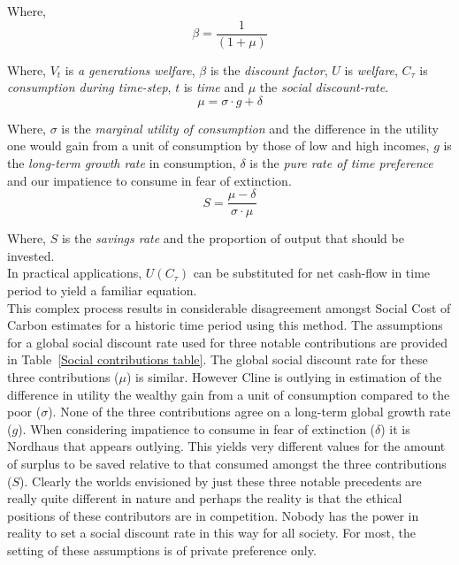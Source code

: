 \documentclass[11pt, oneside]{article}   	%
\begin{document}
Where,
\begin{equation}
\beta = \frac{1}{(1+\mu)}
\end{equation}

Where, $V_t$ is \emph{a generations welfare}, $\beta$ is the \emph{discount factor}, $U$ is \emph{welfare}, $C_\tau$ is \emph{consumption during time-step}, $t$ is \emph{time} and $\mu$ the \emph{social discount-rate}.\\

\begin{equation}
\mu = \sigma \cdot g + \delta
\end{equation}

Where, $\sigma$ is the \emph{marginal utility of consumption} and the difference in the utility one would gain from a unit of consumption by those of low and high incomes, $g$ is the \emph{long-term growth rate} in consumption, $\delta$ is the \emph{pure rate of time preference} and our impatience to consume in fear of extinction.\\

\begin{equation}
S = \frac{\mu-\delta}{\sigma \cdot \mu}
\end{equation}

Where, $S$ is the \emph{savings rate} and the proportion of output that should be invested.\\

In practical applications, $U (C_\tau)$ can be substituted for net cash-flow in time period to yield a familiar equation.\\

This complex process results in considerable disagreement amongst Social Cost of Carbon estimates for a historic time period using this method.
The assumptions for a global social discount rate used for three notable contributions are provided in Table~\ref{Social contributions table}.
The global social discount rate for these three contributions ($\mu$) is similar.
However Cline is outlying in estimation of the difference in utility the wealthy gain from a unit of consumption compared to the poor ($\sigma$).
None of the three contributions agree on a long-term global growth rate ($g$).
When considering impatience to consume in fear of extinction ($\delta$) it is Nordhaus that appears outlying.
This yields very different values for the amount of surplus to be saved relative to that consumed amongst the three contributions ($S$).
Clearly the worlds envisioned by just these three notable precedents are really quite different in nature and perhaps the reality is that the ethical positions of these contributors are in competition.
Nobody has the power in reality to set a social discount rate in this way for all society.
For most, the setting of these assumptions is of private preference only.\\
\end{document}
